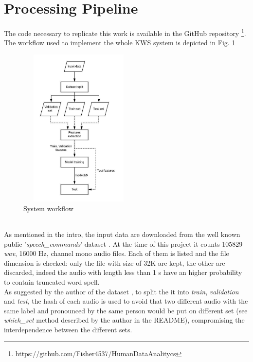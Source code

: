 \section{Processing Pipeline}
\label{sec:processing_pipeine}

\noindent The code necessary to replicate this work is available in the GitHub repository \footnote{https://github.com/Fisher4537/HumanDataAnalitycs}.\\
The workflow used to implement the whole KWS system is depicted in Fig. \ref{fig:pipeline} \\
\begin{figure}[h]
			\centering
	    	\includegraphics[width=6cm, height=8cm ,width=0.25\textwidth]{pipeline}
	    	\caption{System workflow}
	    	\label{fig:pipeline}
\end{figure} \\
\noindent As mentioned in the intro, the input data are downloaded from the well known public '{\it{speech\_commands}}' dataset \cite{Warden-2018}. At the time of this project it counts 105829 \textit{wav}, 16000 Hz, channel mono audio files. Each of them is listed and the file dimension is checked: only the file with size of 32K are kept, the other are discarded, indeed the audio with length less than 1 s have an higher probability to contain truncated word spell. \\
As suggested by the author of the dataset \cite{Warden-2018}, to split the it into \textit{train}, \textit{validation} and \textit{test}, the hash of each audio is used to avoid that two different audio with the same label and pronounced by the same person would be put on different set (see \textit{which\_set} method described by the author in the README), compromising the interdependence between the different sets. \\
